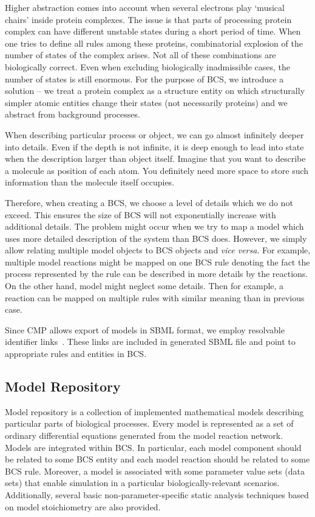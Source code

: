 \documentclass[12pt]{fithesis2}
\begin{document}
Higher abstraction comes into account when several electrons play `musical chairs' inside protein complexes. The issue is that parts of processing protein complex can have different unstable states during a short period of time. When one tries to define all rules among these proteins, combinatorial explosion of the number of states of the complex arises. Not all of these combinations are biologically correct. Even when excluding biologically inadmissible cases, the number of states is still enormous. For the purpose of BCS, we introduce a solution -- we treat a protein complex as a structure entity on which structurally simpler atomic entities change their states (not necessarily proteins) and we abstract from background processes.

When describing particular process or object, we can go almost infinitely deeper into details. Even if the depth is not infinite, it is deep enough to lead into state when the description larger than object itself. Imagine that you want to describe a molecule as position of each atom. You definitely need more space to store such information than the molecule itself occupies.

Therefore, when creating a BCS, we choose a level of details which we do not exceed. This ensures the size of BCS will not exponentially increase with additional details. The problem might occur when we try to map a model which uses more detailed description of the system than BCS does. However, we simply allow relating multiple model objects to BCS objects and \emph{vice versa}. For example, multiple model reactions might be mapped on one BCS rule denoting the fact the process represented by the rule can be described in more details by the reactions. On the other hand, model might neglect some details. Then for example, a reaction can be mapped on multiple rules with similar meaning than in previous case.

Since CMP allows export of models in SBML format, we employ resolvable identifier links~\cite{juty2011identifiers}. These links are included in generated SBML file and point to appropriate rules and entities in BCS.

\subsection{Model Repository}
\label{model}

Model repository is a collection of implemented mathematical models describing particular parts of biological processes. Every model is represented as a set of ordinary differential equations generated from the model reaction network. Models are integrated within BCS. In particular, each model component should be related to some BCS entity and each model reaction should be related to some BCS rule. Moreover, a model is associated with some parameter value sets (data sets) that enable simulation in a particular biologically-relevant scenarios. Additionally, several basic non-parameter-specific static analysis techniques based on model stoichiometry are also provided.
\end{document}
